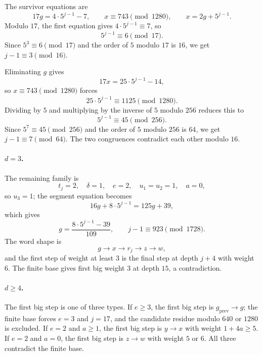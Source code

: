 The survivor equations are
\begin{equation*}
  17g=4\cdot5^{j-1}-7,\qquad
  x\equiv743\pmod{1280},\qquad x=2g+5^{j-1}.
\end{equation*}
Modulo $17$, the first equation gives $4\cdot5^{j-1}\equiv7$, so
\begin{equation*}
  5^{j-1}\equiv6\pmod{17}.
\end{equation*}
Since $5^3\equiv6\pmod{17}$ and the order of $5$ modulo $17$ is $16$,
we get $j-1\equiv3\pmod{16}$.

Eliminating $g$ gives
\begin{equation*}
  17x=25\cdot5^{j-1}-14,
\end{equation*}
so $x\equiv743\pmod{1280}$ forces
\begin{equation*}
  25\cdot5^{j-1}\equiv1125\pmod{1280}.
\end{equation*}
Dividing by $5$ and multiplying by the inverse of $5$ modulo $256$
reduces this to
\begin{equation*}
  5^{j-1}\equiv45\pmod{256}.
\end{equation*}
Since $5^7\equiv45\pmod{256}$ and the order of $5$ modulo $256$ is
$64$, we get $j-1\equiv7\pmod{64}$.  The two congruences contradict
each other modulo $16$.

\paragraph{$d=3$.}
The remaining family is
\begin{equation*}
  t_j=2,\quad \delta=1,\quad e=2,\quad u_1=u_2=1,\quad a=0,
\end{equation*}
so $u_3=1$; the segment equation becomes
\begin{equation*}
  16g+8\cdot5^{j-1}=125g+39,
\end{equation*}
which gives
\begin{equation*}
  g=\frac{8\cdot5^{j-1}-39}{109},\qquad
  j-1\equiv923\pmod{1728}.
\end{equation*}
The word shape is
\begin{equation*}
  g\to x\to r_j\to z\to w,
\end{equation*}
and the first step of weight at least $3$ is the final step at depth
$j+4$ with weight $6$.  The finite base gives first big weight $3$ at
depth $15$, a contradiction.

\paragraph{$d\ge4$.}
The first big step is one of three types.  If $e\ge3$, the first big
step is $g_{\mathrm{prev}}\to g$; the finite base forces $e=3$ and
$j=17$, and the candidate residue modulo $640$ or $1280$ is
excluded.  If $e=2$ and $a\ge1$, the first big step is $y\to x$ with
weight $1+4a\ge5$.  If $e=2$ and $a=0$, the first big step is
$z\to w$ with weight $5$ or $6$.  All three contradict the finite base.

